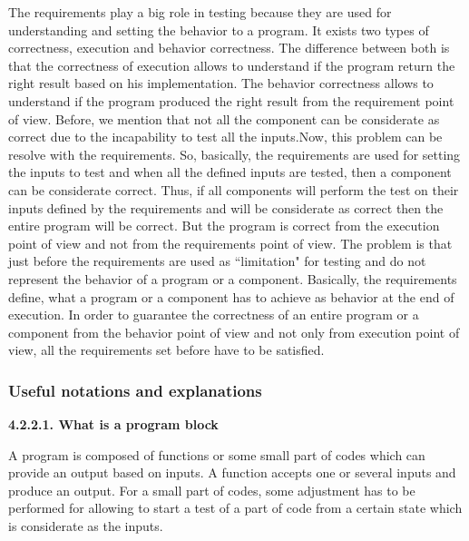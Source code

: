 \documentclass[conference,compsoc]{IEEEtran}
\begin{document}
The requirements play a big role in testing because they are used for understanding and setting the behavior to a program. 
\newline
It exists two types of correctness, execution and behavior correctness. The difference between both is that the correctness of execution allows to understand if the program return the right result based on his implementation. The behavior correctness allows to understand if the program produced the right result from the requirement point of view. 
\newline
Before, we mention that not all the component can be considerate as correct due to the incapability to test all the inputs.Now, this problem can be resolve with the requirements. So, basically, the requirements are used for setting the inputs to test and when all the defined inputs are tested, then a component can be considerate correct. 
\newline
Thus, if all components will perform the test on their inputs defined by the requirements and will be considerate as correct then the entire program will be correct. But the program is correct from the execution point of view and not from the requirements point of view. 
\newline
The problem is that just before the requirements are used as ``limitation" for testing and do not represent the behavior of a program or a component. Basically, the requirements define, what a program or a component has to achieve as behavior at the end of execution. In order to guarantee the correctness of an entire program or a component from the behavior point of view and not only from execution point of view, all the requirements set before have to be satisfied. 

\subsubsection{Useful notations and explanations}
\noindent
\newline\newline  
\textbf{4.2.2.1. What is a program block}
\newline

A program is composed of functions or some small part of codes which can provide an output based on inputs. A function accepts one or several inputs and produce an output. For a small part of codes, some adjustment has to be performed for allowing to start a test of a part of code from a certain state which is considerate as the inputs.  
\end{document}
